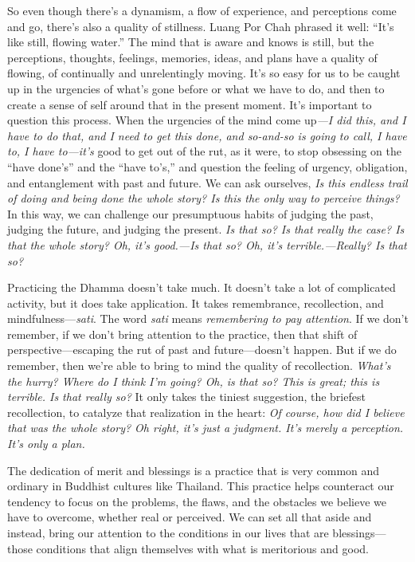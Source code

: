 So even though there's a dynamism, a flow of experience, and 
perceptions come and go, there's also a quality of stillness. Luang Por 
Chah phrased it well: ``It's like still, flowing water.'' The mind that 
is aware and knows is still, but the perceptions, thoughts, feelings, 
memories, ideas, and plans have a quality of flowing, of continually 
and unrelentingly moving. It's so easy for us to be caught up in the 
urgencies of what's gone before or what we have to do, and then to 
create a sense of self around that in the present moment. It's 
important to question this process. When the urgencies of the mind come 
up\emph{---I did this, and I have to do that, and I need to get this 
done, and so-and-so is going to call, I have to, I have to---it's} good 
to get out of the rut, as it were, to stop obsessing on the ``have 
done's'' and the ``have to's,'' and question the feeling of urgency, 
obligation, and entanglement with past and future. We can ask 
ourselves, \emph{Is this endless trail of doing and being done the 
whole story? Is this the only way to perceive things?} In this way, we 
can challenge our presumptuous habits of judging the past, judging the 
future, and judging the present. \emph{Is that so? Is that really the 
case? Is that the whole story? Oh, it's good.---Is that so? Oh, it's 
terrible.---Really? Is that so?}

Practicing the Dhamma doesn't take much. It doesn't take a lot of 
complicated activity, but it does take application. It takes 
remembrance, recollection, and mindfulness---\emph{sati}. The word 
\emph{sati} means \emph{remembering to pay attention}. If we don't 
remember, if we don't bring attention to the practice, then that shift 
of perspective---escaping the rut of past and future---doesn't happen. 
But if we do remember, then we're able to bring to mind the quality of 
recollection. \emph{What's the hurry? Where do I think I'm going? Oh, 
is that so? This is great; this is terrible. Is that really so?} It 
only takes the tiniest suggestion, the briefest recollection, to 
catalyze that realization in the heart: \emph{Of course, how did I 
believe that was the whole story? Oh right, it's just a judgment. It's 
merely a perception. It's only a plan.}


The dedication of merit and blessings is a practice that is very common 
and ordinary in Buddhist cultures like Thailand. This practice helps 
counteract our tendency to focus on the problems, the flaws, and the 
obstacles we believe we have to overcome, whether real or perceived. We 
can set all that aside and instead, bring our attention to the 
conditions in our lives that are blessings---those conditions that 
align themselves with what is meritorious and good.

